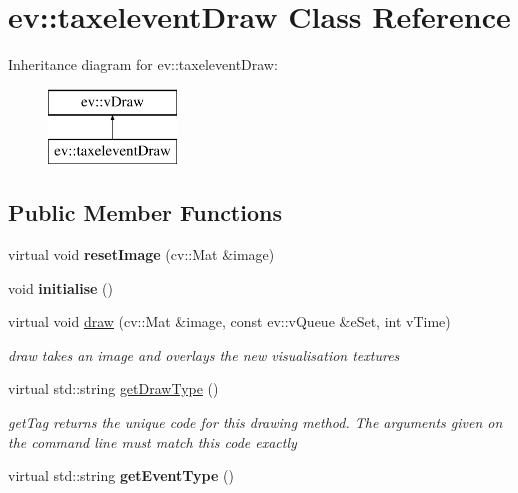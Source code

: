 \hypertarget{classev_1_1taxeleventDraw}{}\section{ev\+:\+:taxelevent\+Draw Class Reference}
\label{classev_1_1taxeleventDraw}
Inheritance diagram for ev\+:\+:taxelevent\+Draw\+:\begin{figure}[H]
\begin{center}
\leavevmode
\includegraphics[height=2.000000cm]{classev_1_1taxeleventDraw}
\end{center}
\end{figure}
\subsection*{Public Member Functions}
\begin{DoxyCompactItemize}
\item 
\mbox{\label{classev_1_1taxeleventDraw_a0d36f9cfb5b25f484a673a5b4e87212d}} 
virtual void {\bfseries reset\+Image} (cv\+::\+Mat \&image)
\item 
\mbox{\label{classev_1_1taxeleventDraw_a1f3b8b62fcb02639932f776b4bb99bd1}} 
void {\bfseries initialise} ()
\item 
virtual void \hyperlink{classev_1_1taxeleventDraw_ad2ff0348ee1b362e3c50508ffefdf9d1}{draw} (cv\+::\+Mat \&image, const ev\+::v\+Queue \&e\+Set, int v\+Time)
\begin{DoxyCompactList}\small\item\em draw takes an image and overlays the new visualisation textures \end{DoxyCompactList}\item 
virtual std\+::string \hyperlink{classev_1_1taxeleventDraw_a474b409ea48a97749caaf172f5fd467a}{get\+Draw\+Type} ()
\begin{DoxyCompactList}\small\item\em get\+Tag returns the unique code for this drawing method. The arguments given on the command line must match this code exactly \end{DoxyCompactList}\item 
\mbox{\label{classev_1_1taxeleventDraw_ae3f6ee8378f0f99c653b6ed648fdf88c}} 
virtual std\+::string {\bfseries get\+Event\+Type} ()
\end{DoxyCompactItemize}
